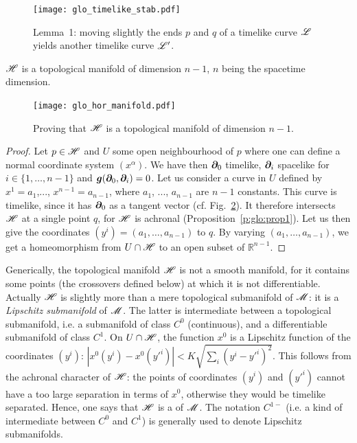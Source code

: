 \begin{figure}
\centerline{\texttt{[image: glo\_timelike\_stab.pdf]}}
\caption[]{\label{f:glo:timelike_stab} \footnotesize
Lemma~1: moving slightly the ends $p$ and $q$ of a timelike curve $\mathscr{L}$
yields another timelike curve $\mathscr{L}'$.}
\end{figure}


\begin{prop}
$\mathscr{H}$ is a topological manifold of dimension $n-1$, $n$ being the spacetime
dimension.
\end{prop}

\begin{figure}
\centerline{\texttt{[image: glo\_hor\_manifold.pdf]}}
\caption[]{\label{f:glo:hor_manifold} \footnotesize
Proving that $\mathscr{H}$ is a topological manifold of dimension $n-1$.}
\end{figure}

\begin{proof}
Let $p\in\mathscr{H}$ and $U$ some open neighbourhood of $p$ where one can define
a normal coordinate system $(x^\alpha)$. We have then $\bm{\partial}_0$ timelike,
$\bm{\partial}_i$ spacelike for $i\in\{1,\ldots,n-1\}$ and $\bm{g}(\bm{\partial}_0, \bm{\partial}_i) = 0$.
Let us consider a curve in $U$ defined by $x^1 = a_1$,..., $x^{n-1} = a_{n-1}$,
where $a_1$, ..., $a_{n-1}$ are $n-1$ constants.
This curve is timelike, since it has $\bm{\partial}_0$ as a tangent vector
(cf. Fig.~\ref{f:glo:hor_manifold}).
It therefore intersects $\mathscr{H}$ at a single point $q$, for $\mathscr{H}$ is achronal
(Proposition~\ref{p:glo:prop1}).
Let us then give the coordinates $(y^i) = (a_1,\ldots,a_{n-1})$ to $q$.
By varying $(a_1,\ldots,a_{n-1})$, we get a homeomorphism from $U\cap\mathscr{H}$
to an open subset of $\mathbb{R}^{n-1}$.
\end{proof}

\begin{remark}
Generically, the topological manifold $\mathscr{H}$ is not a smooth manifold, for it
contains some points (the crossovers defined below) at which it is not differentiable.
Actually $\mathscr{H}$ is slightly more than a mere topological submanifold of $\mathscr{M}$: it is a
\emph{Lipschitz submanifold} of $\mathscr{M}$. The latter is
intermediate between a topological submanifold, i.e.
a submanifold of class $C^0$ (continuous), and a differentiable submanifold of
class $C^1$. On $U\cap\mathscr{H}$, the function $x^0$ is a Lipschitz function
of the coordinates $(y^i)$: $\left|x^0(y^i) - x^0({y'}^i)\right| < K \sqrt{\sum_i (y^i - {y'}^i)^2}$.
This follows from the achronal character of $\mathscr{H}$: the points of coordinates
$(y^i)$ and $({y'}^i)$ cannot have a too large separation in terms of $x^0$,
otherwise they would be timelike separated.
Hence, one says that $\mathscr{H}$ is a  of $\mathscr{M}$. The notation $C^{1-}$ (i.e. a kind of intermediate between
$C^0$ and $C^1$) is generally used to denote Lipschitz submanifolds.
\end{remark}

